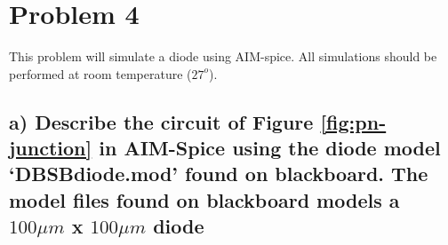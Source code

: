 \section{Problem 4}
This problem will simulate a diode using AIM-spice. All simulations should be performed
at room temperature ($27^o$).

\subsection*{a) Describe the circuit of Figure \ref*{fig:pn-junction} in AIM-Spice using the diode model ‘DBSBdiode.mod’ found on blackboard. The model files found on blackboard models a $100 \mu m$ x $100 \mu m$ diode}

